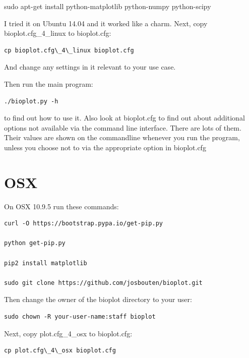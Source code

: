 \documentclass[letterpaper,10pt,english]{sphinxmanual}
\begin{document}
sudo apt-get install python-matplotlib python-numpy python-scipy

I tried it on Ubuntu 14.04 and it worked like a charm.
Next, copy bioplot.cfg\_4\_linux to bioplot.cfg:

\begin{Verbatim}[commandchars=\\\{\}]
cp bioplot.cfg\_4\_linux bioplot.cfg
\end{Verbatim}

And change any settings in it relevant to your use case.

Then run the main program:

\begin{Verbatim}[commandchars=\\\{\}]
./bioplot.py -h
\end{Verbatim}

to find out how to use it.
Also look at bioplot.cfg to find out about additional options not available
via the command line interface. There are lots of them.  Their values are shown on the
commandline whenever you run the program, unless you choose not to via the appropriate
option in bioplot.cfg


\section{OSX}
\label{install:osx}
On OSX 10.9.5 run these commands:

\begin{Verbatim}[commandchars=\\\{\}]
curl -O https://bootstrap.pypa.io/get-pip.py

python get-pip.py

pip2 install matplotlib

sudo git clone https://github.com/josbouten/bioplot.git
\end{Verbatim}

Then change the owner of the bioplot directory to your user:

\begin{Verbatim}[commandchars=\\\{\}]
sudo chown -R your-user-name:staff bioplot
\end{Verbatim}

Next, copy plot.cfg\_4\_osx to bioplot.cfg:

\begin{Verbatim}[commandchars=\\\{\}]
cp plot.cfg\_4\_osx bioplot.cfg
\end{Verbatim}
\end{document}
